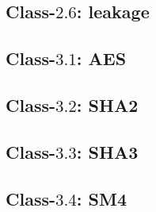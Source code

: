 
\subsection{Class-$2.6$: leakage}
\label{appx:instr_equiv:2:6}


\subsection{Class-$3.1$: AES}
\label{appx:instr_equiv:3:1}


\subsection{Class-$3.2$: SHA2}
\label{appx:instr_equiv:3:2}


\subsection{Class-$3.3$: SHA3}
\label{appx:instr_equiv:3:3}


\subsection{Class-$3.4$: SM4}
\label{appx:instr_equiv:3:4}

